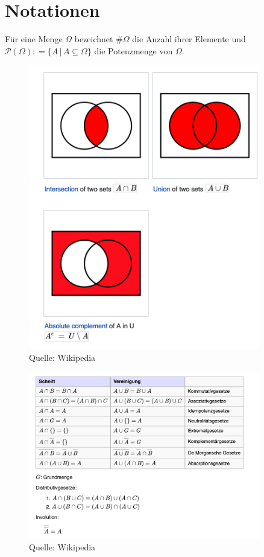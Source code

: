 
\section{Notationen}

Für eine Menge $\Omega$ bezeichnet $\# \Omega$ die Anzahl ihrer Elemente und $\mathcal{P} (\Omega) : = \{ A \, | \, A \subseteq \Omega \}$ die Potenzmenge von $\Omega$. 


\begin{figure}[htp]
      \centering
    \includegraphics[width=0.9\textwidth]{images/Venn}

      \caption{Quelle: Wikipedia}
\end{figure}


\begin{figure}[htp]
      \centering
    \includegraphics[width=0.9\textwidth]{images/mengengesetze}

      \caption{Quelle: Wikipedia}
\end{figure}



\newpage